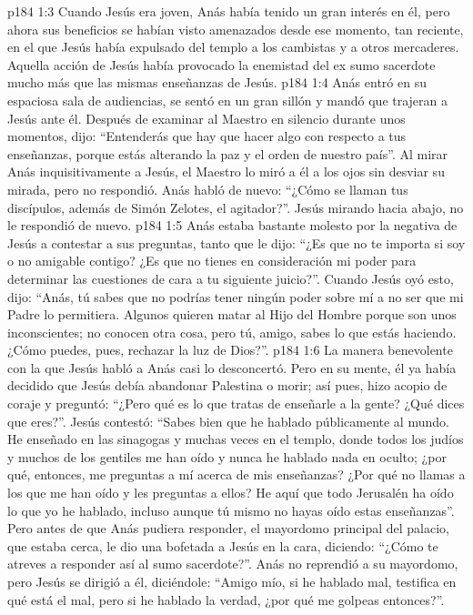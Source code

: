 \vs p184 1:3 Cuando Jesús era joven, Anás había tenido un gran interés en él, pero ahora sus beneficios se habían visto amenazados desde ese momento, tan reciente, en el que Jesús había expulsado del templo a los cambistas y a otros mercaderes. Aquella acción de Jesús había provocado la enemistad del ex sumo sacerdote mucho más que las mismas enseñanzas de Jesús.
\vs p184 1:4 Anás entró en su espaciosa sala de audiencias, se sentó en un gran sillón y mandó que trajeran a Jesús ante él. Después de examinar al Maestro en silencio durante unos momentos, dijo: “Entenderás que hay que hacer algo con respecto a tus enseñanzas, porque estás alterando la paz y el orden de nuestro país”. Al mirar Anás inquisitivamente a Jesús, el Maestro lo miró a él a los ojos sin desviar su mirada, pero no respondió. Anás habló de nuevo: “¿Cómo se llaman tus discípulos, además de Simón Zelotes, el agitador?”. Jesús mirando hacia abajo, no le respondió de nuevo.
\vs p184 1:5 Anás estaba bastante molesto por la negativa de Jesús a contestar a sus preguntas, tanto que le dijo: “¿Es que no te importa si soy o no amigable contigo? ¿Es que no tienes en consideración mi poder para determinar las cuestiones de cara a tu siguiente juicio?”. Cuando Jesús oyó esto, dijo: “Anás, tú sabes que no podrías tener ningún poder sobre mí a no ser que mi Padre lo permitiera. Algunos quieren matar al Hijo del Hombre porque son unos inconscientes; no conocen otra cosa, pero tú, amigo, sabes lo que estás haciendo. ¿Cómo puedes, pues, rechazar la luz de Dios?”.
\vs p184 1:6 La manera benevolente con la que Jesús habló a Anás casi lo desconcertó. Pero en su mente, él ya había decidido que Jesús debía abandonar Palestina o morir; así pues, hizo acopio de coraje y preguntó: “¿Pero qué es lo que tratas de enseñarle a la gente? ¿Qué dices que eres?”. Jesús contestó: “Sabes bien que he hablado públicamente al mundo. He enseñado en las sinagogas y muchas veces en el templo, donde todos los judíos y muchos de los gentiles me han oído y nunca he hablado nada en oculto; ¿por qué, entonces, me preguntas a mí acerca de mis enseñanzas? ¿Por qué no llamas a los que me han oído y les preguntas a ellos? He aquí que todo Jerusalén ha oído lo que yo he hablado, incluso aunque tú mismo no hayas oído estas enseñanzas”. Pero antes de que Anás pudiera responder, el mayordomo principal del palacio, que estaba cerca, le dio una bofetada a Jesús en la cara, diciendo: “¿Cómo te atreves a responder así al sumo sacerdote?”. Anás no reprendió a su mayordomo, pero Jesús se dirigió a él, diciéndole: “Amigo mío, si he hablado mal, testifica en qué está el mal, pero si he hablado la verdad, ¿por qué me golpeas entonces?”.
